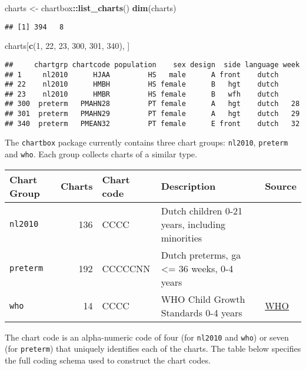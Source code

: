 \documentclass[]{book}
\newenvironment{Shaded}{\begin{snugshade}}{\end{snugshade}}
\newcommand{\DecValTok}[1]{\textcolor[rgb]{0.00,0.00,0.81}{#1}}
\newcommand{\KeywordTok}[1]{\textcolor[rgb]{0.13,0.29,0.53}{\textbf{#1}}}
\newcommand{\NormalTok}[1]{#1}
\newcommand{\OperatorTok}[1]{\textcolor[rgb]{0.81,0.36,0.00}{\textbf{#1}}}
\newcommand{\StringTok}[1]{\textcolor[rgb]{0.31,0.60,0.02}{#1}}
\begin{document}
\begin{Shaded}
\begin{Highlighting}[]
\NormalTok{charts <-}\StringTok{ }\NormalTok{chartbox}\OperatorTok{::}\KeywordTok{list_charts}\NormalTok{()}
\KeywordTok{dim}\NormalTok{(charts)}
\end{Highlighting}
\end{Shaded}

\begin{verbatim}
## [1] 394   8
\end{verbatim}

\begin{Shaded}
\begin{Highlighting}[]
\NormalTok{charts[}\KeywordTok{c}\NormalTok{(}\DecValTok{1}\NormalTok{, }\DecValTok{22}\NormalTok{, }\DecValTok{23}\NormalTok{, }\DecValTok{300}\NormalTok{, }\DecValTok{301}\NormalTok{, }\DecValTok{340}\NormalTok{), ]}
\end{Highlighting}
\end{Shaded}

\begin{verbatim}
##     chartgrp chartcode population    sex design  side language week
## 1     nl2010      HJAA         HS   male      A front    dutch     
## 22    nl2010      HMBH         HS female      B   hgt    dutch     
## 23    nl2010      HMBR         HS female      B   wfh    dutch     
## 300  preterm   PMAHN28         PT female      A   hgt    dutch   28
## 301  preterm   PMAHN29         PT female      A   hgt    dutch   29
## 340  preterm   PMEAN32         PT female      E front    dutch   32
\end{verbatim}

The \texttt{chartbox} package currently contains three chart groups: \texttt{nl2010}, \texttt{preterm} and \texttt{who}. Each group collects charts of a similar type.

\begin{longtable}[]{@{}lrlll@{}}
\toprule
Chart Group & Charts & Chart code & Description & Source\tabularnewline
\midrule
\endhead
\texttt{nl2010} & 136 & CCCC & Dutch children 0-21 years, including minorities & \citet{talma2010}\tabularnewline
\texttt{preterm} & 192 & CCCCCNN & Dutch preterms, ga \textless{}= 36 weeks, 0-4 years & \citet{bocca2012}\tabularnewline
\texttt{who} & 14 & CCCC & WHO Child Growth Standards 0-4 years & \href{https://www.who.int/childgrowth/en/}{WHO}\tabularnewline
\bottomrule
\end{longtable}

The chart code is an alpha-numeric code of four (for \texttt{nl2010} and \texttt{who}) or seven (for \texttt{preterm}) that uniquely identifies each of the charts. The table below specifies the full coding schema used to construct the chart codes.
\end{document}

